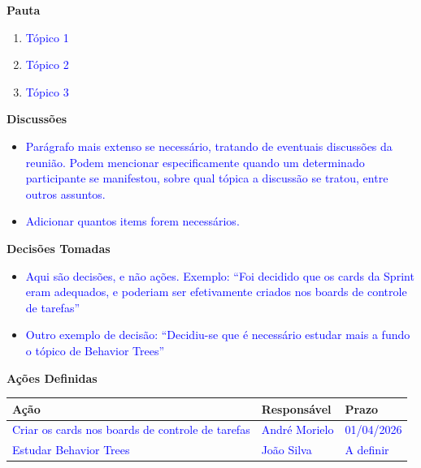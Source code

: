 \documentclass[12pt,a4paper]{article}
\begin{document}
\vspace{1em}

\textbf{Pauta}

\begin{enumerate}
\item \textcolor{blue}{Tópico 1}
\item \textcolor{blue}{Tópico 2}
\item \textcolor{blue}{Tópico 3}
\end{enumerate}

\vspace{1em}

\textbf{Discussões}

\begin{itemize}
\item \textcolor{blue}{Parágrafo mais extenso se necessário, tratando de eventuais discussões da reunião. Podem mencionar especificamente quando um determinado participante se manifestou, sobre qual tópica a discussão se tratou, entre outros assuntos.}
\item \textcolor{blue}{Adicionar quantos items forem necessários.}
\end{itemize}

\vspace{1em}

\textbf{Decisões Tomadas}

\begin{itemize}
\item \textcolor{blue}{Aqui são decisões, e não ações. Exemplo: ``Foi decidido que os cards da Sprint eram adequados, e poderiam ser efetivamente criados nos boards de controle de tarefas''}
\item \textcolor{blue}{Outro exemplo de decisão: ``Decidiu-se que é necessário estudar mais a fundo o tópico de Behavior Trees''}
\end{itemize}

\vspace{1em}

\textbf{Ações Definidas}

\begin{longtable}{|p{6cm}|p{4cm}|p{3cm}|}
\hline
\textbf{Ação} & \textbf{Responsável} & \textbf{Prazo} \\
\hline
 \textcolor{blue}{Criar os cards nos boards de controle de tarefas} & \textcolor{blue}{André Morielo} & \textcolor{blue}{01/04/2026} \\
\hline
 \textcolor{blue}{Estudar Behavior Trees} & \textcolor{blue}{João Silva} & \textcolor{blue}{A definir} \\
\hline
\end{longtable}
\end{document}
